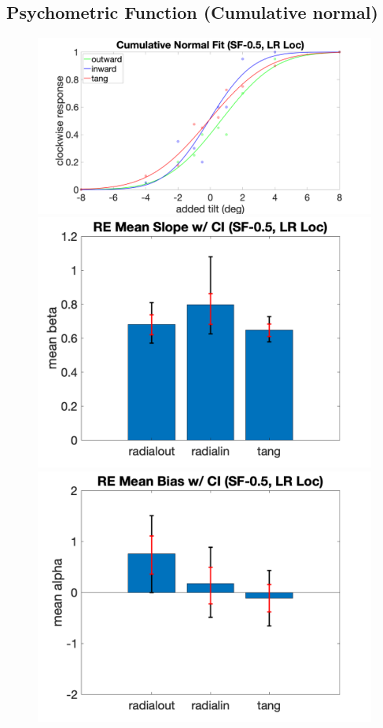 \documentclass[11pt]{article} %
\begin{document}
\subsection{Psychometric Function (Cumulative normal)}
\begin{figure}[H]
\centering %
\includegraphics[scale=.06]{Images/PF_SF0.5.png}
\includegraphics[scale=.11]{Images/MeanSlopeError_SF0.5.png}
\includegraphics[scale=.11]{Images/MeanBiasError_SF0.5.png}

\end{figure}
\end{document}
